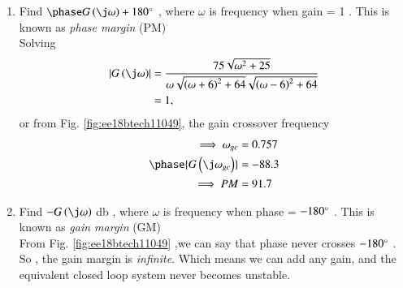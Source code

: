 \begin{enumerate}[label=\thesection.\arabic*.,ref=\thesection.\theenumi]
\item Find $\phase G\brak{\j\omega} + 180\degree$ , where $\omega$ is frequency when gain = 1 . This is known as  {\em phase margin} (PM)
\\
\solution Solving 
\begin{align}
\label{eq:ee18btech11049_gain}
\begin{split}
\abs{G\brak{\j\omega}} &=   \frac{75\sqrt{\omega^2 + 25}}{\omega\sqrt{\brak{\omega+6}^2+64}\sqrt{\brak{\omega-6}^2+64}} 
\\
&= 1,
\end{split}
\end{align}
or from Fig. \ref{fig:ee18btech11049}, the gain crossover frequency 
%
\begin{align}
\implies
\omega_{gc} &=  0.757  \\
\phase{G\brak{\j\omega_{gc}}} &= -88.3 \\
\implies
PM &= 91.7  
\end{align}

\item Find $-G\brak{\j\omega}  $ db , where $\omega$ is frequency when phase = $-180\degree$ . This is known as  {\em gain margin} (GM)
\\
\solution From Fig. \ref{fig:ee18btech11049} ,we can say that phase  never crosses $-180\degree$ .
So , the gain margin is {\em infinite}.
Which means we can add any gain, and the equivalent closed loop system never becomes unstable.

\end{enumerate}

